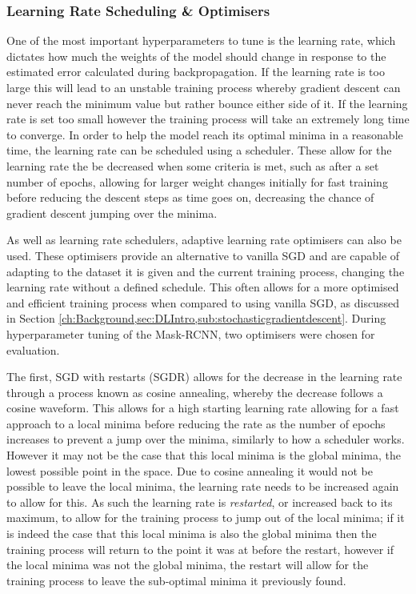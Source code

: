 \subsubsection{Learning Rate Scheduling \& Optimisers}\label{ch:cetDet,sec:ModelSelection,sub:TrainingHyperparameters,subsub:learningRateOptimisers}
One of the most important hyperparameters to tune is the learning rate, which dictates how much the weights of the model should change in response to the estimated error calculated during backpropagation. If the learning rate is too large this will lead to an unstable training process whereby gradient descent can never reach the minimum value but rather bounce either side of it. If the learning rate is set too small however the training process will take an extremely long time to converge. In order to help the model reach its optimal minima in a reasonable time, the learning rate can be scheduled using a scheduler. These allow for the learning rate the be decreased when some criteria is met, such as after a set number of epochs, allowing for larger weight changes initially for fast training before reducing the descent steps as time goes on, decreasing the chance of gradient descent jumping over the minima.

As well as learning rate schedulers, adaptive learning rate optimisers can also be used. These optimisers provide an alternative to vanilla SGD and are capable of adapting to the dataset it is given and the current training process, changing the learning rate without a defined schedule. This often allows for a more optimised and efficient training process when compared to using vanilla SGD, as discussed in Section \ref{ch:Background,sec:DLIntro,sub:stochasticgradientdescent}. During hyperparameter tuning of the Mask-RCNN, two optimisers were chosen for evaluation. 

The first, SGD with restarts (SGDR) \cite{loshchilov_sgdr:_2016} allows for the decrease in the learning rate through a process known as cosine annealing, whereby the decrease follows a cosine waveform. This allows for a high starting learning rate allowing for a fast approach to a local minima before reducing the rate as the number of epochs increases to prevent a jump over the minima, similarly to how a scheduler works. However it may not be the case that this local minima is the global minima, the lowest possible point in the space. Due to cosine annealing it would not be possible to leave the local minima, the learning rate needs to be increased again to allow for this. As such the learning rate is \textit{restarted}, or increased back to its maximum, to allow for the training process to jump out of the local minima; if it is indeed the case that this local minima is also the global minima then the training process will return to the point it was at before the restart, however if the local minima was not the global minima, the restart will allow for the training process to leave the sub-optimal minima it previously found. 

